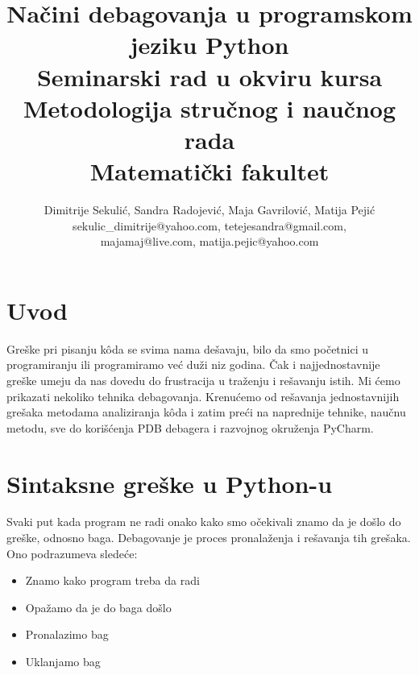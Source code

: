 \documentclass[a4paper]{article}
\begin{document}
\title{Načini debagovanja u programskom \\    jeziku Python\\ \small{Seminarski rad u okviru kursa\\Metodologija stručnog i naučnog rada\\ Matematički fakultet}}

\author{Dimitrije Sekulić, Sandra Radojević, Maja Gavrilović, Matija Pejić\\ sekulic\_dimitrije@yahoo.com, tetejesandra@gmail.com,\\ majamaj@live.com, matija.pejic@yahoo.com}


\maketitle


\setcounter{tocdepth}{1}
\tableofcontents

\newpage

\section{Uvod}
\label{sec:uvod}

Greške pri pisanju k\^{o}da se svima nama dešavaju, bilo da smo početnici u programiranju ili programiramo već duži niz godina. Čak i najjednostavnije greške umeju da nas dovedu do frustracija u traženju i rešavanju istih. Mi ćemo prikazati nekoliko tehnika debagovanja. Krenućemo od rešavanja jednostavnijih grešaka metodama analiziranja k\^{o}da i zatim preći na naprednije tehnike, naučnu metodu, sve do korišćenja PDB debagera i razvojnog okruženja PyCharm.

\section{Sintaksne greške u Python-u}
Svaki put kada program ne radi onako kako smo očekivali znamo da je došlo do greške, odnosno baga. Debagovanje je proces pronalaženja i rešavanja tih grešaka. Ono podrazumeva sledeće:
\begin{itemize}
\item Znamo kako program treba da radi
\item Opažamo da je do baga došlo
\item Pronalazimo bag
\item Uklanjamo bag
\end{itemize}
\end{document}
